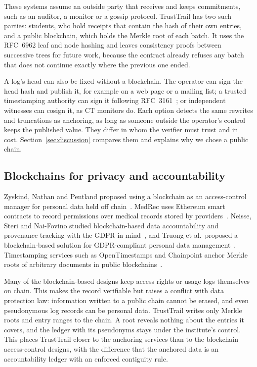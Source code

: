These systems assume an outside party that receives and keeps commitments, such as an auditor, a monitor or a gossip protocol. TrustTrail has two such parties: students, who hold receipts that contain the hash of their own entries, and a public blockchain, which holds the Merkle root of each batch. It uses the RFC~6962 leaf and node hashing and leaves consistency proofs between successive trees for future work, because the contract already refuses any batch that does not continue exactly where the previous one ended.

A log's head can also be fixed without a blockchain. The operator can sign the head hash and publish it, for example on a web page or a mailing list; a trusted timestamping authority can sign it following RFC~3161~\cite{rfc3161}; or independent witnesses can cosign it, as CT monitors do. Each option detects the same rewrites and truncations as anchoring, as long as someone outside the operator's control keeps the published value. They differ in whom the verifier must trust and in cost. Section~\ref{sec:discussion} compares them and explains why we chose a public chain.

\subsection{Blockchains for privacy and accountability}
Zyskind, Nathan and Pentland proposed using a blockchain as an access-control manager for personal data held off chain~\cite{zyskind2015decentralizing}. MedRec uses Ethereum smart contracts to record permissions over medical records stored by providers~\cite{azaria2016medrec}. Neisse, Steri and Nai-Fovino studied blockchain-based data accountability and provenance tracking with the GDPR in mind~\cite{neisse2017blockchain}, and Truong et al.\ proposed a blockchain-based solution for GDPR-compliant personal data management~\cite{truong2020gdpr}. Timestamping services such as OpenTimestamps and Chainpoint anchor Merkle roots of arbitrary documents in public blockchains~\cite{todd2016opentimestamps,chainpoint}.

Many of the blockchain-based designs keep access rights or usage logs themselves on chain. This makes the record verifiable but raises a conflict with data protection law: information written to a public chain cannot be erased, and even pseudonymous log records can be personal data. TrustTrail writes only Merkle roots and entry ranges to the chain. A root reveals nothing about the entries it covers, and the ledger with its pseudonyms stays under the institute's control. This places TrustTrail closer to the anchoring services than to the blockchain access-control designs, with the difference that the anchored data is an accountability ledger with an enforced contiguity rule.

